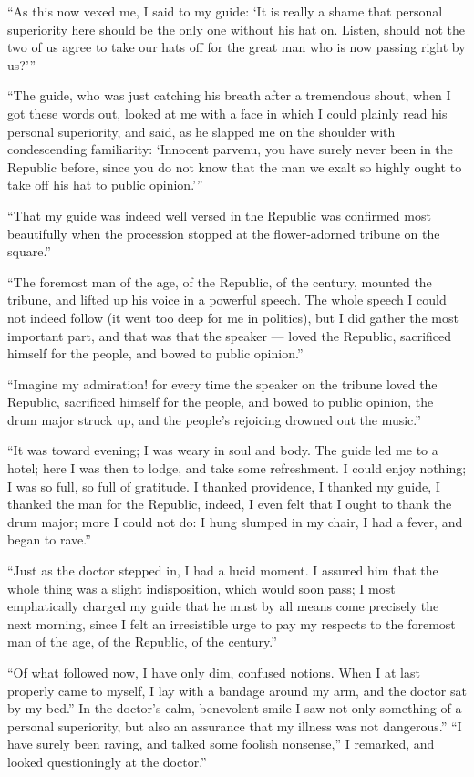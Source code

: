 \documentclass[12pt,a4paper]{book}
\begin{document}
``As this now vexed me, I said to my guide: `It is really a shame that personal superiority here should be the only one without his hat on. Listen, should not the two of us agree to take our hats off for the great man who is now passing right by us?'''

``The guide, who was just catching his breath after a tremendous shout, when I got these words out, looked at me with a face in which I could plainly read his personal superiority, and said, as he slapped me on the shoulder with condescending familiarity: `Innocent parvenu, you have surely never been in the
Republic before, since you do not know that the man we exalt so highly ought to take off his hat to public opinion.'''

``That my guide was indeed well versed in the Republic was confirmed most beautifully when the procession stopped at the flower-adorned tribune on the square.''

``The foremost man of the age, of the Republic, of the century, mounted the tribune, and lifted up his voice in a powerful speech. The whole speech I could not indeed follow (it went too deep for me in politics), but I did gather the most important part, and that was that the speaker --- loved the Republic, sacrificed himself for the people, and bowed to public opinion.''

``Imagine my admiration! for every time the speaker on the tribune loved the Republic, sacrificed himself for the people, and bowed to public opinion, the drum major struck up, and the people's rejoicing drowned out the music.''

``It was toward evening; I was weary in soul and body. The guide led me to a hotel; here I was then to lodge, and take some refreshment. I could enjoy nothing; I was so full, so full of gratitude. I thanked providence, I thanked my guide, I thanked the man for the Republic, indeed, I even felt that I ought to thank the drum major; more I could not do: I hung slumped in my chair, I had a fever, and began to rave.''

``Just as the doctor stepped in, I had a lucid moment. I assured him that the whole thing was a slight indisposition, which would soon pass; I most emphatically charged my guide that he must by all means come precisely the next morning, since I felt an irresistible urge to pay my respects to the foremost man of the age, of the Republic, of the century.''

``Of what followed now, I have only dim, confused notions. When I at last properly came to myself, I lay with a bandage around my arm, and the doctor sat by my bed.''
In the doctor's calm, benevolent smile I saw not only something of a personal superiority, but also an assurance that my illness was not dangerous.''
``I have surely been raving, and talked some foolish nonsense,'' I remarked, and looked questioningly at the doctor.''
\end{document}
